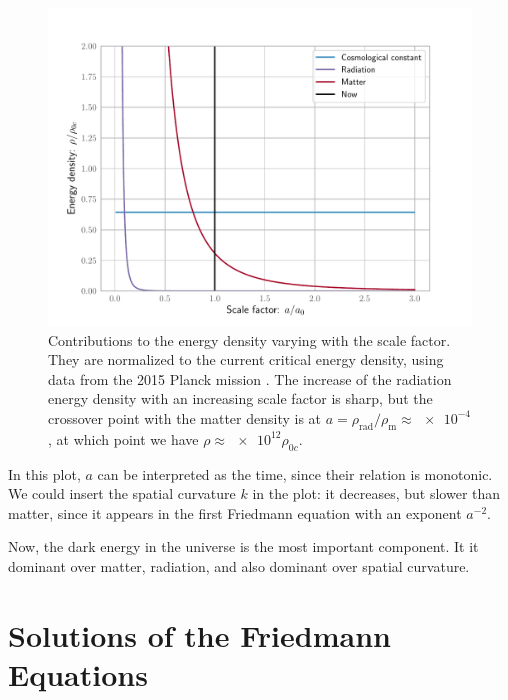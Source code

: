 \documentclass[main.tex]{subfiles}
\begin{document}
\begin{figure}[ht]
\centering
\includegraphics[width=\textwidth]{figures/global_energy_contributions.pdf}
\caption{Contributions to the energy density varying with the scale factor. They are normalized to the current critical energy density, using data from the 2015 Planck mission \cite{PlanckCollaboration:2016XIII}. The increase of the radiation energy density with an increasing scale factor is sharp, but the crossover point with the matter density is at \(a = \rho_{\text{rad}}/\rho_{\text{m}} \approx \num{e-4}\), at which point we have \(\rho \approx \num{e12} \rho_{0c}\).}
\label{fig:global_energy_contributions}
\end{figure}

In this plot, \(a\) can be interpreted as the time, since their relation is monotonic.
We could insert the spatial curvature \(k\) in the plot: it decreases, but slower than matter, since it appears in the first Friedmann equation with an exponent \(a^{-2}\). 


Now, the dark energy in the universe is the most important component. It it dominant over matter, radiation, and also dominant over spatial curvature.

\section{Solutions of the Friedmann Equations}
\label{sec:solutions-to-friedmann-equations}
\end{document}
